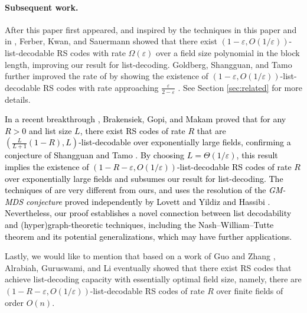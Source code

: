 \documentclass[11pt]{article}
\renewcommand{\epsilon}{\varepsilon}
\newcommand{\mkw}[1]{{\color{orange}{\small [Mary: #1]}}}
\begin{document}

\paragraph{Subsequent work.}
After this paper first appeared, and
inspired by the techniques in this paper and in \cite{shangguan2019combinatorial0}, Ferber, Kwan, and Sauermann \cite{ferber2020} showed that there exist $(1-\epsilon,O(1/\epsilon))$-list-decodable RS codes with rate $\Omega(\epsilon)$ over a field size polynomial in the block length, improving our result for list-decoding. Goldberg, Shangguan, and Tamo further improved the rate of \cite{ferber2020} by showing the existence of $(1-\epsilon,O(1/\epsilon))$-list-decodable RS codes with rate approaching $\frac{\epsilon}{2-\epsilon}$ \cite{goldberg2021listdecoding}.
See Section \ref{sec:related} for more details.

\textcolor{black}{
In a recent breakthrough \cite{BGM22}, Brakensiek,  Gopi, and Makam proved that for any $R>0$ and list size $L$, there exist RS codes of rate $R$ that are $(\frac{L}{L+1}(1-R), L)$-list-decodable over exponentially large fields, confirming a conjecture of Shangguan and Tamo \cite{shangguan2019combinatorial0}.
By choosing $L=\Theta(1/\epsilon)$, this result implies the existence of $(1-R-\epsilon, O(1/\epsilon))$-list-decodable RS codes of rate $R$ over exponentially large fields and subsumes our result for list-decoding.
The techniques of \cite{BGM22} are very different from ours, and uses the resolution of the \emph{GM-MDS conjecture} \cite{dau2014existence}
proved independently by Lovett \cite{lovett2018mds} and Yildiz and Hassibi \cite{yildiz2019optimum}.
Nevertheless,  our proof establishes a novel connection between list decodability and (hyper)graph-theoretic techniques, including the Nash--William--Tutte theorem and its potential generalizations, which may have further applications.
}

Lastly, we would like to mention that based on a work of Guo and Zhang \cite{guo2023randomly}, Alrabiah, Guruswami, and Li \cite{alrabiah2023randomly} eventually showed that
there exist RS codes that achieve list-decoding capacity with essentially optimal field size, namely, there are $(1-R-\epsilon, O(1/\epsilon))$-list-decodable RS codes of rate $R$ over finite fields of order $O(n)$.
\end{document}
